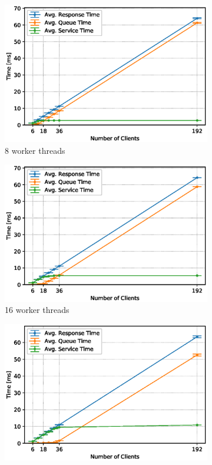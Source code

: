 \documentclass[11pt,a4paper]{article}
\begin{document}
\begin{figure}
    \begin{subfigure}{.5\textwidth}
        \includegraphics[width=1\linewidth]{plots/3_1a_extendedLatencyMiddleware_8w.eps}
        \caption{8 worker threads}
    \end{subfigure}
    \begin{subfigure}{.5\textwidth}
        \includegraphics[width=1\linewidth]{plots/3_1a_extendedLatencyMiddleware_16w.eps}
        \caption{16 worker threads}
    \end{subfigure}
    \begin{subfigure}{.5\textwidth}
        \includegraphics[width=1\linewidth]{plots/3_1a_extendedLatencyMiddleware_32w.eps}

\end{subfigure}
\end{figure}
\end{document}

